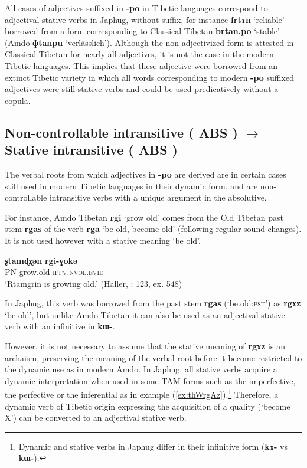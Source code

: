 \documentclass[oneside,a4paper,11pt]{article}
\makeatletter
\newcommand{\ipa}[1]{{\phon\textbf{\mbox{#1}}}} %
\newcommand{\refb}[1]{(\ref{#1})}
\def\fakesc#1{%
  \begingroup%
  \xdef\fake@name{\csname\curr@fontshape/\f@size\endcsname}%
  \fontsize{\fontdimen8\fake@name}{\baselineskip}\selectfont%
  \uppercase{#1}%
  \endgroup%
}
\makeatother
\begin{document}
All cases of adjectives suffixed in \ipa{-po} in Tibetic languages correspond to adjectival stative verbs in Japhug, without suffix, for instance \ipa{frtɤn} `reliable' borrowed from a form corresponding to Classical Tibetan \ipa{brtan.po} `stable' (Amdo \ipa{ɸtanpu} `verlässlich'). Although the non-adjectivized form is attested in Classical Tibetan for nearly all adjectives, it is not the case in the modern Tibetic languages. This implies that these adjective were borrowed from an extinct Tibetic variety in which all words corresponding to modern \ipa{-po} suffixed adjectives were still stative verbs and could be used predicatively without a copula.

  
\subsection{Non-controllable intransitive (\fakesc{abs}) $\rightarrow$ Stative intransitive (\fakesc{abs})}
The verbal roots from which adjectives in \ipa{-po} are derived are in certain cases still used in modern Tibetic languages in their dynamic form, and are non-controllable intransitive verbs with a unique argument in the absolutive.

For instance, Amdo Tibetan \ipa{rgi} `grow old' comes from the Old Tibetan past stem \ipa{rgas} of the verb \ipa{rga} `be old, become old' (following regular sound changes). It is not used however with a stative meaning `be old'.

\begin{exe}
\ex \label{ex:rgi}
\gll
\ipa{ʂtamɖʐən} 	\ipa{rgi-ɣokə}  	 \\
PN grow.old-\textsc{ipfv.nvol.evid} \\
\glt `Rtamgrin is growing old.' (Haller, \citeyear{haller04themchen}: 123, ex. 548)
\end{exe}

In Japhug, this verb was borrowed from the past stem \ipa{rgas} (`be.old:\textsc{pst}') as \ipa{rgɤz} `be old', but unlike Amdo Tibetan it can also be used as an adjectival stative verb with an infinitive in \ipa{kɯ-}. 

However, it is not necessary to assume that the stative meaning of \ipa{rgɤz} is an archaism, preserving the meaning of the verbal root before it become restricted to the dynamic use as in modern Amdo. In Japhug, all stative verbs acquire a dynamic interpretation when used in some TAM forms such as the imperfective, the perfective or the inferential as in example \refb{ex:thWrgAz}.\footnote{Dynamic and stative verbs in Japhug differ in their infinitive form (\ipa{kɤ-} vs \ipa{kɯ-}). } Therefore, a dynamic verb of Tibetic origin expressing the acquisition of a quality (`become X') can be converted to an adjectival stative verb.
\end{document}
